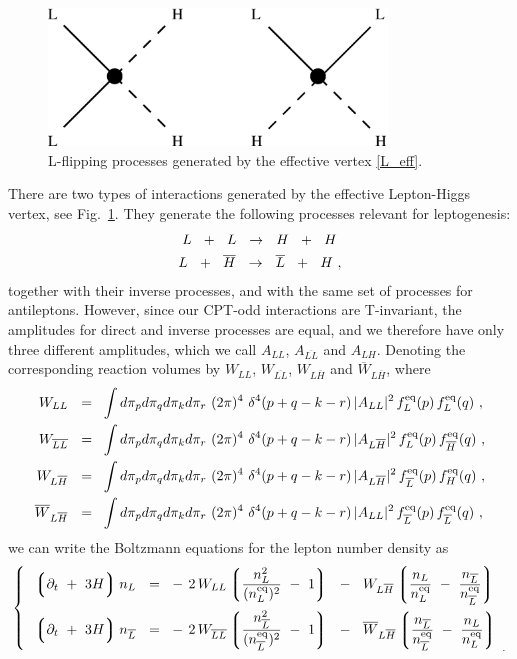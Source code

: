 \documentclass[12pt]{revtex4}
\newcommand{\eq}{{\rm eq}}
\newcommand{\lgr}{\left\lgroup}
\newcommand{\rgr}{\right\rgroup}
\newcommand{\p}{\partial}
\newcommand{\ov}{\overline}
\begin{document}
\begin{figure}
\includegraphics[width=9cm]{lflip.eps}
\caption{L-flipping processes generated by the effective vertex \eqref{L_eff}.}
\label{lflip_fig}
\end{figure}
There are two types of interactions generated by the effective
Lepton-Higgs vertex, see Fig.~\ref{lflip_fig}.
They generate the following processes relevant for leptogenesis:
\begin{align}
\notag
	L~~+~~L ~~\rightarrow~~ H~~+~~H~  \\
\notag
	L~~+~~\ov{H} ~~\rightarrow~~ \ov{L}~~+~~H~,
\end{align}
together with their inverse processes, and with the same set of processes
for antileptons.
However, since our CPT-odd interactions are T-invariant, the amplitudes for
direct and inverse processes are equal, and we therefore have 
only three different amplitudes, which we call  
$ A_{LL} $, $ A_{\ov{LL}} $ and $ A_{LH} $.
Denoting the corresponding reaction volumes by
$ W_{LL} $, $ W_{\ov{LL}} $, $ W_{L\ov{H}} $ and $ \ov{W}_{L\ov{H}} $,
where 
\begin{align*}
	W_{LL}   ~~=~~  &
		\int d\pi_p d\pi_q d\pi_k d\pi_r ~
		(2\pi)^4~ \delta^4 ( p + q - k - r )\,
		| A_{LL} |^2\, f_L^\eq(p)\, f_L^\eq(q)~, \\
	W_{\ov{LL}}   ~~=~~  &
		\int d\pi_p d\pi_q d\pi_k d\pi_r ~
		(2\pi)^4~ \delta^4 ( p + q - k - r )\,
		| A_{L\ov{H}} |^2\, f_L^\eq(p)\, f_{\ov{H}}^\eq(q)~, \\
	W_{L\ov{H}}  ~~=~~  &
		\int d\pi_p d\pi_q d\pi_k d\pi_r ~
		(2\pi)^4~ \delta^4 ( p + q - k - r )\,
		| A_{L\ov{H}} |^2\, f_{\ov{L}}^\eq(p)\, f_H^\eq(q)~, \\
	\ov{W}_{L\ov{H}}  ~~=~~  &
		\int d\pi_p d\pi_q d\pi_k d\pi_r ~
		(2\pi)^4~ \delta^4 ( p + q - k - r )\,
		| A_{LL} |^2\, f_{\ov{L}}^\eq(p)\, f_{\ov{L}}^\eq(q)~,
\end{align*}
	we can write the Boltzmann equations for the lepton number density
	as
\begin{equation*}
\left\{~~
\begin{split}
	\lgr \p_t ~+~ 3H \rgr 
		n_L ~~=~~ &
	-\, 2\, W_{LL} \lgr \frac{n_L^2}{(n_L^\eq)^2} ~-~ 1 \rgr
	~~-~~
	W_{L\ov{H}} \lgr \frac{n_L}{n_L^\eq} ~-~ 
			\frac{n_{\ov{L}}}{n_{\ov{L}}^\eq} \rgr  \\
	\lgr \p_t ~+~ 3H \rgr 
		n_{\ov{L}} ~~=~~ &
	-\, 2\, W_{\ov{LL}} \lgr 
		\frac{n_{\ov{L}}^2}{(n_{\ov{L}}^\eq)^2} ~-~ 1 \rgr
	~~-~~
	\ov{W}_{L\ov{H}} \lgr \frac{n_{\ov{L}}}{n_{\ov{L}}^\eq} ~-~ 
			\frac{n_L}{n_L^\eq} \rgr  \\
\end{split}
\right._{~.}
\end{equation*}
\end{document}
